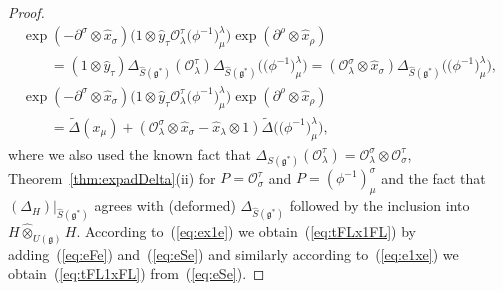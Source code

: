 \documentclass[pdftex]{sigma}
\def\gg{\mathfrak{g}}
\def\OO{\mathcal{O}}
\def\hx{\hat{x}}
\def\hy{\hat{y}}
\numberwithin{equation}{section}
\begin{document}
\begin{proof}
\begin{gather}
\exp(-\partial^\sigma\otimes\hx_\sigma)\big(1\otimes \hy_\tau\OO^\tau_\lambda\big(\phi^{-1}\big)^\lambda_\mu\big)\exp(\partial^\rho\otimes\hx_\rho) \nonumber\\
\qquad{} = (1\otimes\hy_\tau)\Delta_{\hat{S}(\gg^*)}(\OO^\tau_\lambda)\Delta_{\hat{S}(\gg^*)}\big(\big(\phi^{-1}\big)^\lambda_\mu\big)
 = (\mathcal{O}^\sigma_\lambda\otimes\hx_\sigma)\Delta_{\hat{S}(\gg^*)}\big(\big(\phi^{-1}\big)^\lambda_\mu\big),\nonumber\\
\label{eq:eSe}
\exp(-\partial^\sigma\otimes\hx_\sigma)\big(1\otimes \hy_\tau\OO^\tau_\lambda\big(\phi^{-1}\big)^\lambda_\mu\big)\exp(\partial^\rho\otimes\hx_\rho)\nonumber\\
\qquad{}
= \tilde\Delta(x_\mu) + (\mathcal{O}^\sigma_\lambda\otimes\hx_\sigma-\hx_\lambda\otimes 1)\tilde\Delta\big(\big(\phi^{-1}\big)^\lambda_\mu\big),
\end{gather}
where we also used the known fact \cite{halg} that $\Delta_{S(\gg^*)}(\mathcal{O}^\tau_\lambda) = \mathcal{O}_\lambda^\sigma\otimes\mathcal{O}^\tau_\sigma$, Theorem~\ref{thm:expadDelta}(ii) for $P = \OO^\tau_\sigma$ and $P = (\phi^{-1})^\sigma_\mu$ and the fact that $(\Delta_H)|_{\hat{S}(\gg^*)}$ agrees with (deformed) $\Delta_{\hat{S}(\gg^*)}$ followed by the inclusion into $H\hat\otimes_{U(\gg)}H$. According to~(\ref{eq:ex1e}) we obtain~(\ref{eq:tFLx1FL}) by adding~(\ref{eq:eFe}) and~(\ref{eq:eSe}) and similarly according to~(\ref{eq:e1xe}) we obtain~(\ref{eq:tFL1xFL}) from~(\ref{eq:eSe}).


\end{proof}
\end{document}
